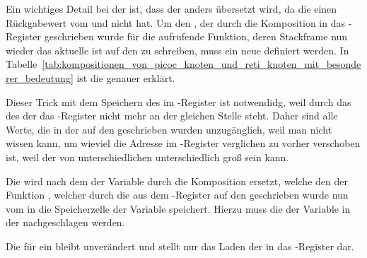 Ein wichtiges Detail bei der   ist, dass der   anders übersetzt wird, da die  einen Rückgabewert vom   und nicht  hat. Um den , der durch die Komposition  in das -Register geschrieben wurde für die aufrufende Funktion, deren Stackframe nun wieder das aktuelle ist auf den  zu schreiben, muss ein neue   definiert werden. In Tabelle~\ref{tab:kompositionen_von_picoc_knoten_und_reti_knoten_mit_besonderer_bedeutung} ist die   genauer erklärt.

Dieser Trick mit dem Speichern des  im -Register ist notwendidg, weil durch das  des  der  das -Register nicht mehr an der gleichen Stelle steht. Daher sind alle  Werte, die in der  auf den  geschrieben wurden unzugänglich, weil man nicht wissen kann, um wieviel die Adresse im -Register verglichen zu vorher verschoben ist, weil der  von unterschiedlichen  unterschiedlich  groß sein kann.

Die   wird nach dem  der Variable  durch die Komposition  ersetzt, welche den  der Funktion , welcher durch die   aus dem -Register auf den  geschrieben wurde nun vom  in die Speicherzelle der Variable  speichert. Hierzu muss die  der Variable  in der  nachgeschlagen werden.

Die   für ein    bleibt unverändert und stellt nur das Laden der  in das -Register dar.

